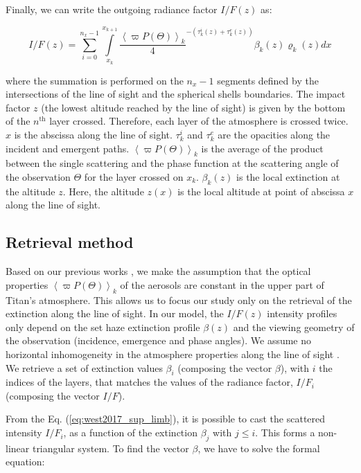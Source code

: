 Finally, we can write the outgoing radiance factor $I/F (z)$ as:

\begin{equation}
I/F (z) = \sum_{i=0}^{n_x-1} \int\limits_{x_k}^{x_{k+1}}
\frac{\left< \varpi P(\Theta) \right>_k} {4}
^{-\left( \tau^i_k\left(z\right) + \tau^e_k\left(z\right) \right)}
\beta_k\left(z\right) \varrho_k\left(z\right) d{x}
\label{eq:west2017_sup_limb}
\end{equation}

where the summation is performed on the $n_x-1$ segments defined by the intersections of the line of sight and the
spherical shells boundaries. The impact factor $z$ (the lowest altitude reached by the line of sight) is given by the
bottom of the $n^\mathrm{th}$ layer crossed. Therefore, each layer of the atmosphere is crossed twice. $x$ is the
abscissa along the line of sight. $\tau^i_k$ and $\tau^e_k$ are the opacities along the incident and emergent paths.
$\left< \varpi P(\Theta)\right>_k$ is the average of the product between the single scattering and the phase function
at the scattering angle of the observation $\Theta$ for the layer crossed on $x_k$.  $\beta_k(z)$ is the local
extinction at the altitude $z$. Here, the altitude $z(x)$ is the local altitude at point of abscissa $x$ along the
line of sight.


\subsection{Retrieval method}

Based on our previous works \citep{Seignovert2017, West2018}, we make the assumption that the optical properties
$\left<\varpi P(\Theta)\right>_k$ of the aerosols are constant in the upper part of Titan's atmosphere. This allows
us to focus our study only on the retrieval of the extinction along the line of sight.
In our model, the $I/F (z)$ intensity profiles only depend on the set haze extinction profile $\beta(z)$ and the viewing
geometry of the observation (incidence, emergence and phase angles). We assume no horizontal inhomogeneity in the atmosphere
properties along the line of sight \citep{Seignovert2017}. We retrieve a set of extinction values $\beta_i$ (composing
the vector ${\beta}$), with $i$ the indices of the layers, that matches the values of the radiance factor, $I/F_i$
(composing the vector $I/F$).

From the Eq. (\ref{eq:west2017_sup_limb}), it is possible to cast the scattered intensity $I/F_i$, as a function of
the extinction $\beta_j$ with $j \le i$. This forms a non-linear triangular system. To find the vector $\beta$, we
have to solve the formal equation:

